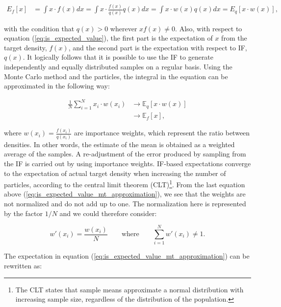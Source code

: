 \begin{equation}
\begin{aligned}
E_f[x] &= \int x\cdot f(x) dx =  \int x\cdot \frac{f(x)}{q(x)}q(x) dx 
= \int x\cdot w(x) q(x) dx = E_q[x\cdot w(x)],
\label{eq:is_expected_value}
\end{aligned}
\end{equation}

\noindent with the condition that \(q(x) > 0\) wherever \(x f(x) \ne 0\). Also, with respect to equation (\ref{eq:is_expected_value}), the first part is the expectation of \(x\) from the target density, \(f(x)\), and the second part is the expectation with respect to IF, \(q(x)\). It logically follows that it is possible to use the IF to generate independently and equally distributed samples on a regular basis. Using the Monte Carlo method and the particles, the integral in the equation can be approximated in the following way:

\begin{equation}
\begin{aligned}
\frac{1}{N} \sum_{i=1}^N x_i \cdot w(x_i) 
&\to \mathbb{E}_q[x\cdot w(x)] \\
&\to \mathbb{E}_f[x],
\label{eq:is_expected_value_mt_approximation}
\end{aligned}
\end{equation}

\noindent where \(w(x_i) = \frac{f(x_i)}{q(x_i)}\) are importance weights, which represent the ratio between densities. In other words, the estimate of the mean is obtained as a weighted average of the samples. A re-adjustment of the error produced by sampling from the IF is carried out by using importance weights. IF-based expectations converge to the expectation of actual target density when increasing the number of particles, according to the central limit theorem (CLT)\footnote{The CLT states that sample means approximate a normal distribution with increasing sample size, regardless of the distribution of the population.}. From the last equation above (\ref{eq:is_expected_value_mt_approximation}), we see that the weights are not normalized and do not add up to one. The normalization here is represented by the factor \(1/N\) and we could therefore consider:

\begin{equation}
    w'(x_i) = \frac{w(x_i)}{N} \qquad\text{where}\qquad \sum_{i=1}^N w'(x_i) \ne 1.
\end{equation}

The expectation in equation (\ref{eq:is_expected_value_mt_approximation}) can be rewritten as:

